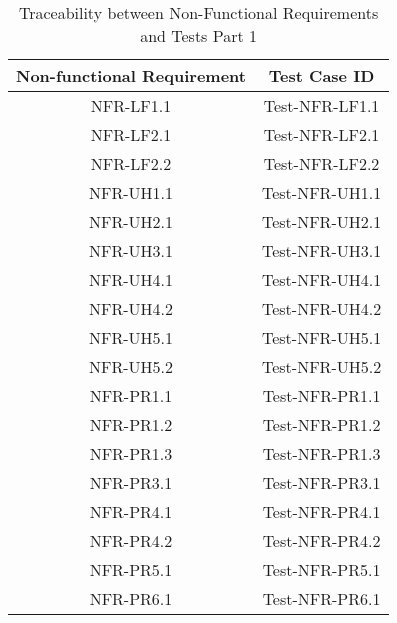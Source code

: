 \documentclass[12pt, titlepage]{article}
\begin{document}
\begin{table}[H]
    \centering
    \begin{tabular}{|c|c|}
    \hline
    Non-functional Requirement & Test Case ID\\
    \hline
    NFR-LF1.1 & Test-NFR-LF1.1\\
    \hline
    NFR-LF2.1 & Test-NFR-LF2.1\\
    \hline
    NFR-LF2.2 & Test-NFR-LF2.2\\
    \hline
    NFR-UH1.1 & Test-NFR-UH1.1\\
    \hline
    NFR-UH2.1 & Test-NFR-UH2.1\\
    \hline
    NFR-UH3.1 & Test-NFR-UH3.1\\
    \hline
    NFR-UH4.1 & Test-NFR-UH4.1\\
    \hline
    NFR-UH4.2 & Test-NFR-UH4.2\\
    \hline
    NFR-UH5.1 & Test-NFR-UH5.1\\
    \hline
    NFR-UH5.2 & Test-NFR-UH5.2\\
    \hline
    NFR-PR1.1 & Test-NFR-PR1.1\\
    \hline
    NFR-PR1.2 & Test-NFR-PR1.2\\
    \hline
    NFR-PR1.3 & Test-NFR-PR1.3\\
    \hline
    NFR-PR3.1 & Test-NFR-PR3.1\\
    \hline
    NFR-PR4.1 & Test-NFR-PR4.1\\
    \hline
    NFR-PR4.2 & Test-NFR-PR4.2\\
    \hline
    NFR-PR5.1 & Test-NFR-PR5.1\\
    \hline
    NFR-PR6.1 & Test-NFR-PR6.1\\
    \hline
    \end{tabular}
    \caption{Traceability between Non-Functional Requirements and Tests Part 1}
\end{table}
\end{document}
